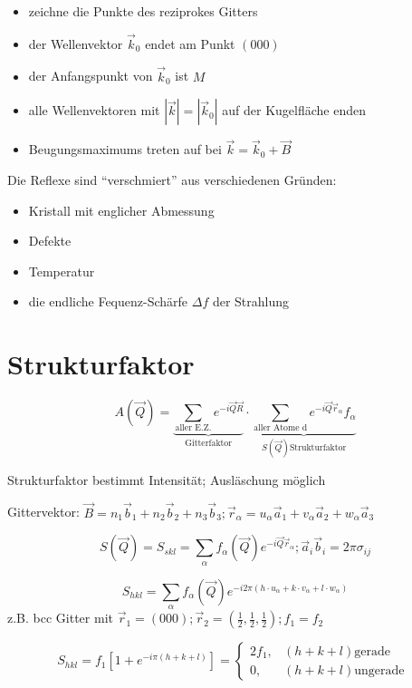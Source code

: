 \begin{itemize}
\item zeichne die Punkte des reziprokes Gitters
\item der Wellenvektor \(\vec k_0\) endet am Punkt \((000)\)
\item der Anfangspunkt von \(\vec k_0\) ist \(M\)
\item alle Wellenvektoren mit \(|\vec k|= |\vec k_0|\) auf der
  Kugelfläche enden
\item Beugungsmaximums treten auf bei \(\vec k= \vec k_0 +\vec B\)
\end{itemize}

Die Reflexe sind ``verschmiert'' aus verschiedenen Gründen:
\begin{itemize}
\item Kristall mit englicher Abmessung
\item Defekte
\item Temperatur
\item die endliche Fequenz-Schärfe \(\Delta f\) der Strahlung
\end{itemize}

\section{Strukturfaktor}

\[  A(\vec Q)= \underbrace{\sum_{\text{aller E.Z.}}e^{-i\vec Q\vec
  R}}_{\text{Gitterfaktor}}\cdot \underbrace{\sum_{\text{aller Atome d}}e^{-i\vec Q\vec r_{\alpha}} f_{\alpha}}_{S(\vec Q) \text{Strukturfaktor}}
\]


Strukturfaktor bestimmt Intensität; Ausläschung möglich

Gittervektor: \( \vec B = n_1 \vec b_1 +  n_2 \vec b_2 + n_3 \vec b_3;
\vec r_\alpha = u_\alpha\vec a_1 + v_\alpha\vec a_2 +w_\alpha\vec a_3\)

\[ S(\vec Q) = S_{skl} = \sum_\alpha f_\alpha(\vec Q)
e^{-i\vec Q\vec r_\alpha}; \vec a_i\vec b_i=2\pi \sigma_{ij}
\]


\[  S_{hkl} = \sum_\alpha f_\alpha(\vec Q) e^{-i2\pi( h\cdot u_\alpha
  + k\cdot v_\alpha +l\cdot w_\alpha)}\]
z.B. bcc Gitter mit \(\vec r_1 = (000); \vec r_2 = (\frac 1 2, \frac 1
2, \frac 1 2); f_1=f_2\)

\[  S_{hkl} =f_1\left[1 + e^{-i\pi( h + k +l)}\right]=\begin{cases}
  2f_1,  & (h+k+l) \text{gerade } \\
  0, & (h+k+l) \text{ungerade }
\end{cases}
\]

